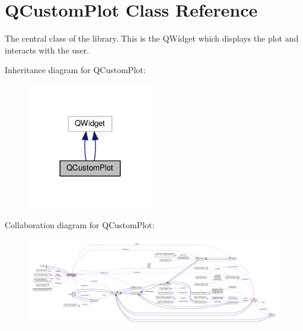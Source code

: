 \hypertarget{class_q_custom_plot}{}\section{Q\+Custom\+Plot Class Reference}
\label{class_q_custom_plot}


The central class of the library. This is the Q\+Widget which displays the plot and interacts with the user.  




Inheritance diagram for Q\+Custom\+Plot\+:\nopagebreak
\begin{figure}[H]
\begin{center}
\leavevmode
\includegraphics[width=156pt]{class_q_custom_plot__inherit__graph}
\end{center}
\end{figure}


Collaboration diagram for Q\+Custom\+Plot\+:\nopagebreak
\begin{figure}[H]
\begin{center}
\leavevmode
\includegraphics[width=350pt]{class_q_custom_plot__coll__graph}
\end{center}
\end{figure}
